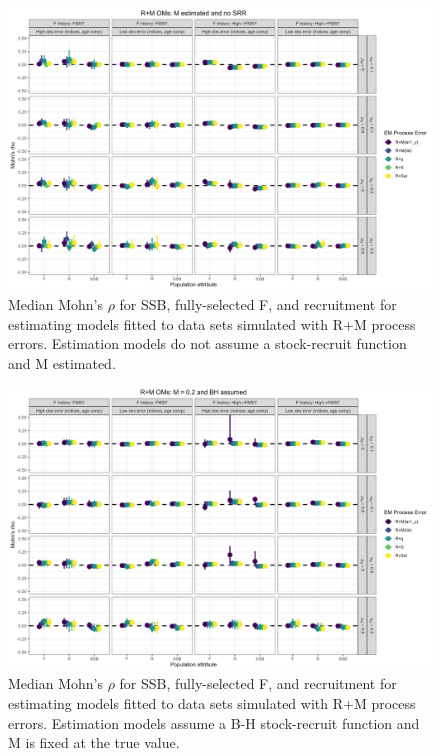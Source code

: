 \documentclass[
  12pt,
]{article}
\begin{document}
\begin{landscape}
\begin{figure}
\caption{Median Mohn's $\rho$ for SSB, fully-selected F, and recruitment for estimating models fitted to data sets simulated with R+M process errors.  Estimation models do not assume a stock-recruit function and M estimated.}\label{M_om_em_R_ME_mohns_rho}
\begin{center}
\includegraphics[width = \textwidth]{M_om_mohns_rho_R_ME.png}
\end{center}
\end{figure}
\end{landscape}

\begin{landscape}
\begin{figure}
\caption{Median Mohn's $\rho$ for SSB, fully-selected F, and recruitment for estimating models fitted to data sets simulated with R+M process errors.  Estimation models assume a B-H stock-recruit function and M is fixed at the true value.}\label{M_om_em_BH_MF_mohns_rho}
\begin{center}
\includegraphics[width = \textwidth]{M_om_mohns_rho_BH_MF.png}
\end{center}
\end{figure}
\end{landscape}
\end{document}
